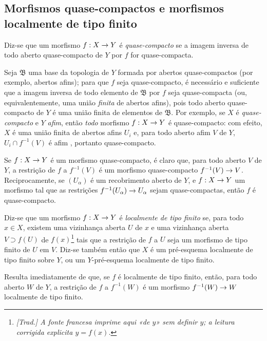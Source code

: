 \documentclass[oneside]{amsart}
\makeatletter
\newcommand{\ega@arrow}[2]{\mathchoice{#1}{#2}{#2}{#2}}
\renewcommand{\to}{\ega@arrow{\longrightarrow}{\rightarrow}}
\newcommand{\oldpage}[2][]{{\marginnote{\normalfont\textbf{#1}~|~#2}}\ignorespaces}
\let\EGAOriginalLabel\label
\renewcommand{\label}[1]{\phantomsection\EGAOriginalLabel{#1}}
\makeatother
\begin{document}
\subsection{Morfismos quase-compactos e morfismos localmente de tipo finito}
\label{subsection:I.6.6}

\begin{definition}[6.6.1]
\label{I.6.6.1}
Diz-se que um morfismo $f:X\to Y$ é \emph{quase-compacto} se a imagem inversa de todo aberto quase-compacto de $Y$ por $f$ for quase-compacta.
\end{definition}

Seja $\mathfrak{B}$ uma base da topologia de $Y$ formada por abertos quase-compactos (por exemplo, abertos afins);
para que $f$ seja quase-compacto, é necessário e suficiente que a imagem inversa de todo elemento de $\mathfrak{B}$ por $f$ seja quase-compacta (ou, equivalentemente, uma união \emph{finita} de abertos afins), pois todo aberto quase-compacto de $Y$ é uma união finita de elementos de $\mathfrak{B}$.
Por exemplo, se $X$ é \emph{quase-compacto} e $Y$ \emph{afim}, então \emph{todo} morfismo $f: X\to Y$ é quase-compacto:
com efeito, $X$ é uma união finita de abertos afins $U_i$ e, para todo aberto afim $V$ de $Y$, $U_i\cap f^{-1}(V)$ é afim , portanto quase-compacto.

Se $f: X\to Y$ é um morfismo quase-compacto, é claro que, para todo aberto $V$ de $Y$, a restrição de $f$ a $f^{-1}(V)$ é um morfismo quase-compacto $f^{-1}(V)\to V$.
Reciprocamente, se $(U_\alpha)$ é um recobrimento aberto de $Y$, e $f: X\to Y$ um morfismo tal que as restrições $f^{-1}(U_\alpha)\to U_\alpha$ sejam quase-compactas, então $f$ é quase-compacto.

\begin{definition}[6.6.2]
\label{I.6.6.2}
Diz-se que um morfismo $f: X\to Y$ é \emph{localmente de tipo finito} se, para todo $x\in X$, existem uma vizinhança aberta $U$ de $x$ e uma vizinhança aberta $V\supset f(U)$ de $f(x)$\footnote{\emph{[Trad.] A fonte francesa imprime aqui «de $y$» sem definir $y$; a leitura corrigida explicita $y=f(x)$.}} tais que a
\oldpage[I]{153}
restrição de $f$ a $U$ seja um morfismo de tipo finito de $U$ em $V$.
Diz-se também então que $X$ é um pré-esquema localmente de tipo finito sobre $Y$, ou um $Y$-pré-esquema localmente de tipo finito.
\end{definition}

Resulta imediatamente de  que, se $f$ é localmente de tipo finito, então, para todo aberto $W$ de $Y$, a restrição de $f$ a $f^{-1}(W)$ é um morfismo $f^{-1}(W)\to W$ localmente de tipo finito.
\end{document}

